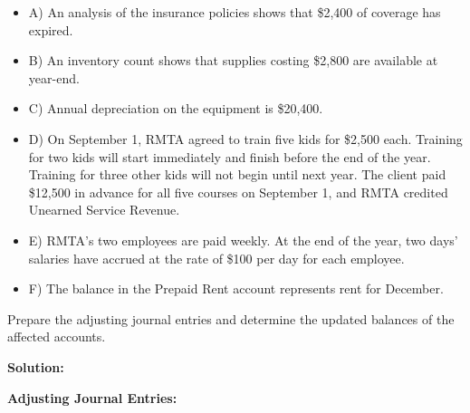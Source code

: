 \documentclass[12pt,a4paper]{book}
\begin{document}
\begin{itemize}
    \item A) An analysis of the insurance policies shows that \$2,400 of coverage has expired.
    \item B) An inventory count shows that supplies costing \$2,800 are available at year-end.
    \item C) Annual depreciation on the equipment is \$20,400.
    \item D) On September 1, RMTA agreed to train five kids for \$2,500 each. Training for two kids will start immediately and finish before the end of the year. Training for three other kids will not begin until next year. The client paid \$12,500 in advance for all five courses on September 1, and RMTA credited Unearned Service Revenue.
    \item E) RMTA’s two employees are paid weekly. At the end of the year, two days’ salaries have accrued at the rate of \$100 per day for each employee.
    \item F) The balance in the Prepaid Rent account represents rent for December.
\end{itemize}

Prepare the adjusting journal entries and determine the updated balances of the affected accounts.

\vspace{0.5cm}

\textbf{Solution:}

\textbf{Adjusting Journal Entries:}
\end{document}
